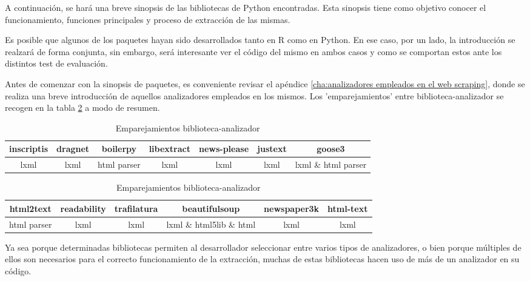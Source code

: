 A continuación, se hará una breve sinopsis de las bibliotecas de Python encontradas. Esta sinopsis tiene 
como objetivo conocer el funcionamiento, funciones principales y proceso de extracción de las mismas.

Es posible que algunos de los paquetes hayan sido desarrollados tanto en R como en Python. En ese caso, por 
un lado, la introducción se realzará de forma conjunta, sin embargo, será interesante ver el código del 
mismo en ambos casos y como se comportan estos ante los distintos test de evaluación.

Antes de comenzar con la sinopsis de paquetes, es conveniente revisar el apéndice \ref{cha:analizadores
empleados en el web scraping}, donde se realiza una breve introducción de aquellos analizadores empleados
en los mismos. Los 'emparejamientos' entre biblioteca-analizador se recogen en la tabla 
\ref{tab:emparejamientos biblioteca-analizador} a modo de resumen.

\begin{table}[h]
  \begin{center}
  \begin{tabular}{| c | c | c | c | c | c | c |} \hline 
    \textbf{inscriptis} & \textbf{dragnet} & \textbf{boilerpy} & \textbf{libextract} & \textbf{news-please} & \textbf{justext} & \textbf{goose3} \\ \hline
    lxml & lxml & html parser & lxml & lxml & lxml & lxml \& html parser \\ \hline
  \end{tabular}

  \hfill \break

  \begin{tabular}{| c | c | c | c | c | c |} \hline 
    \textbf{html2text} & \textbf{readability} & \textbf{trafilatura} & \textbf{beautifulsoup} & \textbf{newspaper3k} & \textbf{html-text}  \\ \hline
    html parser & lxml & lxml & lxml \& html5lib \& html & lxml & lxml \\ \hline
  \end{tabular}

  \caption{Emparejamientos biblioteca-analizador}
  \label{tab:emparejamientos biblioteca-analizador}
  \end{center}
\end{table}

Ya sea porque determinadas bibliotecas permiten al desarrollador seleccionar entre varios tipos de 
analizadores, o bien porque múltiples de ellos son necesarios para el correcto funcionamiento de la 
extracción, muchas de estas bibliotecas hacen uso de más de un analizador en su código.

